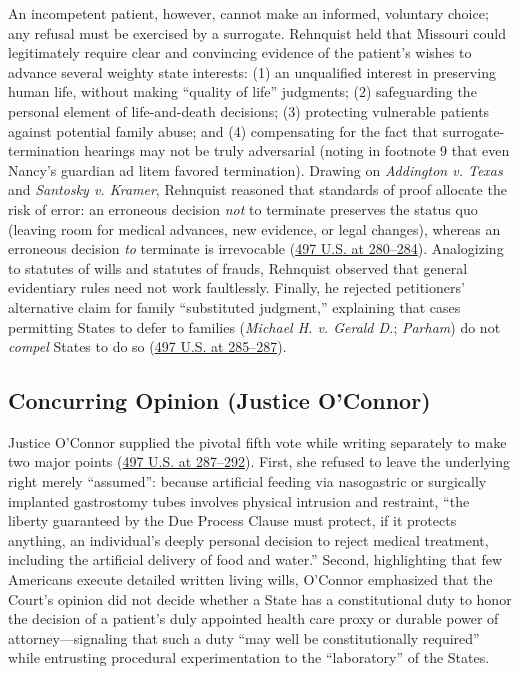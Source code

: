 \documentclass[12pt]{article}
\begin{document}
An incompetent patient, however, cannot make an informed, voluntary choice; any refusal must be exercised by a surrogate. Rehnquist held that Missouri could legitimately require clear and convincing evidence of the patient's wishes to advance several weighty state interests: (1) an unqualified interest in preserving human life, without making ``quality of life'' judgments; (2) safeguarding the personal element of life-and-death decisions; (3) protecting vulnerable patients against potential family abuse; and (4) compensating for the fact that surrogate-termination hearings may not be truly adversarial (noting in footnote 9 that even Nancy's guardian ad litem favored termination). Drawing on \textit{Addington v. Texas} and \textit{Santosky v. Kramer}, Rehnquist reasoned that standards of proof allocate the risk of error: an erroneous decision \textit{not} to terminate preserves the status quo (leaving room for medical advances, new evidence, or legal changes), whereas an erroneous decision \textit{to} terminate is irrevocable (\href{https://supreme.justia.com/cases/federal/us/497/261/}{497 U.S. at 280--284}). Analogizing to statutes of wills and statutes of frauds, Rehnquist observed that general evidentiary rules need not work faultlessly. Finally, he rejected petitioners' alternative claim for family ``substituted judgment,'' explaining that cases permitting States to defer to families (\textit{Michael H. v. Gerald D.}; \textit{Parham}) do not \textit{compel} States to do so (\href{https://supreme.justia.com/cases/federal/us/497/261/}{497 U.S. at 285--287}).

\subsection{Concurring Opinion (Justice O'Connor)}

Justice O'Connor supplied the pivotal fifth vote while writing separately to make two major points (\href{https://supreme.justia.com/cases/federal/us/497/261/}{497 U.S. at 287--292}). First, she refused to leave the underlying right merely ``assumed'': because artificial feeding via nasogastric or surgically implanted gastrostomy tubes involves physical intrusion and restraint, ``the liberty guaranteed by the Due Process Clause must protect, if it protects anything, an individual's deeply personal decision to reject medical treatment, including the artificial delivery of food and water.'' Second, highlighting that few Americans execute detailed written living wills, O'Connor emphasized that the Court's opinion did not decide whether a State has a constitutional duty to honor the decision of a patient's duly appointed health care proxy or durable power of attorney---signaling that such a duty ``may well be constitutionally required'' while entrusting procedural experimentation to the ``laboratory'' of the States.
\end{document}
